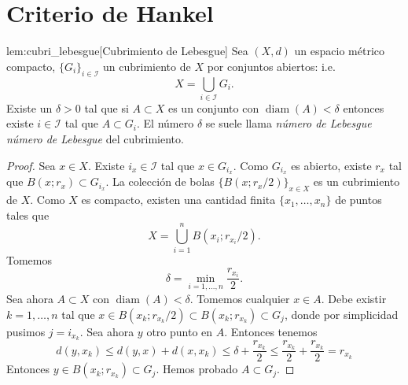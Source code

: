 \section{Criterio de Hankel}

\begin{lema}{lem:cubri_lebesgue}[Cubrimiento de Lebesgue] Sea $(X,d)$ un espacio métrico compacto, $\{G_i\}_{i\in\mathscr{I}}$ un cubrimiento de $X$ por conjuntos abiertos: i.e.
\[
 X=\bigcup_{i\in\mathscr{I}}G_i.
\]
Existe un $\delta>0$ tal que si $A\subset X$ es un conjunto con $\operatorname{diam}(A)<\delta$ entonces existe $i\in\mathscr{I}$ tal que $A\subset G_i$. El número $\delta$ se suele llama  \emph{número de Lebesgue} \emph{número de Lebesgue} del cubrimiento.
 
\end{lema}
\begin{proof} Sea $x\in X$. Existe $i_x\in\mathscr{I}$ tal que $x\in G_{i_x}$. Como $G_{i_x}$ es abierto, existe $r_x$ tal que $B(x;r_x)\subset G_{i_x}$. La colección de bolas $\{B(x;r_x/2)\}_{x\in X}$ es un cubrimiento de $X$. Como $X$ es compacto, existen una cantidad finita $\{x_1,\ldots,x_n\}$ de puntos tales que
\[
 X=\bigcup_{i=1}^n B(x_i;r_{x_i}/2).
\]
Tomemos 
\[
 \delta=\min_{i=1,\ldots,n}\frac{r_{x_i}}{2}.
\]
Sea ahora $A\subset X$ con $\operatorname{diam}(A)<\delta$. Tomemos cualquier $x\in A$. Debe existir $k=1,\ldots,n$ tal que $x\in B(x_k;r_{x_k}/2)\subset B(x_k;r_{x_k})\subset G_j$, donde por simplicidad pusimos $j=i_{x_k}$. Sea ahora $y$ otro punto en $A$. Entonces tenemos
\[
 d(y,x_k)\leq d(y,x)+d(x,x_k)\leq\delta + \frac{r_{x_k}}{2}\leq\frac{r_{x_k}}{2}+ \frac{r_{x_k}}{2}=r_{x_k}
\]
Entonces $y\in B(x_k;r_{x_k})\subset  G_j$. Hemos probado $A\subset G_j$. 
\end{proof}





